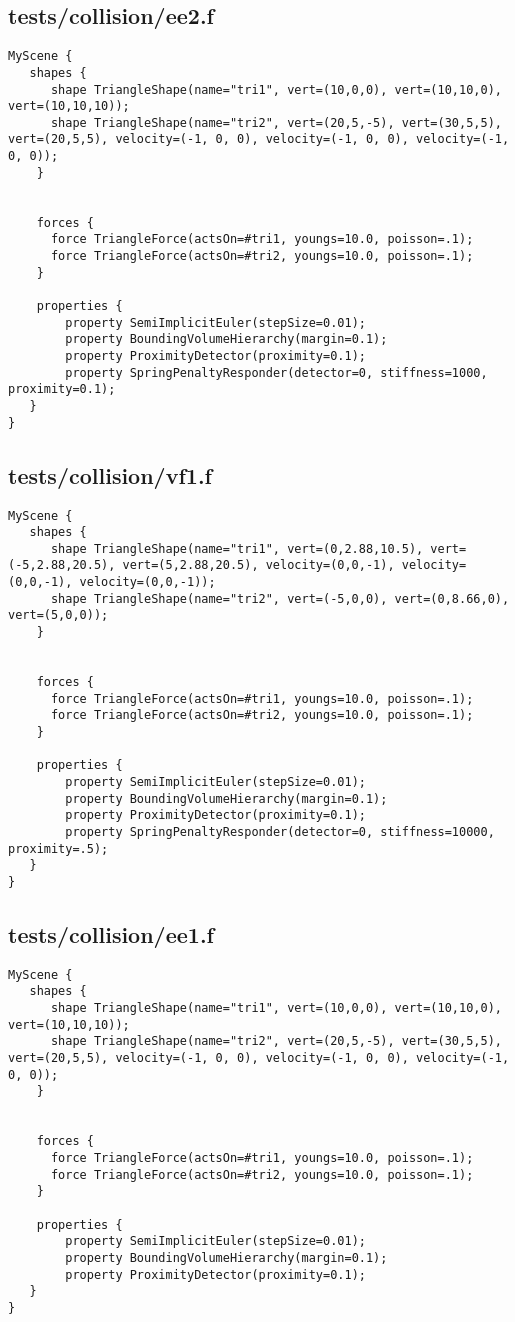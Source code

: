 \subsection*{tests/collision/ee2.f}
\begin{lstlisting}
MyScene {
   shapes {
      shape TriangleShape(name="tri1", vert=(10,0,0), vert=(10,10,0), vert=(10,10,10));
      shape TriangleShape(name="tri2", vert=(20,5,-5), vert=(30,5,5), vert=(20,5,5), velocity=(-1, 0, 0), velocity=(-1, 0, 0), velocity=(-1, 0, 0));
    }

    
    forces {
      force TriangleForce(actsOn=#tri1, youngs=10.0, poisson=.1);
      force TriangleForce(actsOn=#tri2, youngs=10.0, poisson=.1);
    }

    properties { 
        property SemiImplicitEuler(stepSize=0.01);
        property BoundingVolumeHierarchy(margin=0.1);
        property ProximityDetector(proximity=0.1);
        property SpringPenaltyResponder(detector=0, stiffness=1000, proximity=0.1);
   }
}
\end{lstlisting}

\subsection*{tests/collision/vf1.f}
\begin{lstlisting}
MyScene {
   shapes {
      shape TriangleShape(name="tri1", vert=(0,2.88,10.5), vert=(-5,2.88,20.5), vert=(5,2.88,20.5), velocity=(0,0,-1), velocity=(0,0,-1), velocity=(0,0,-1));
      shape TriangleShape(name="tri2", vert=(-5,0,0), vert=(0,8.66,0), vert=(5,0,0));
    }

    
    forces {
      force TriangleForce(actsOn=#tri1, youngs=10.0, poisson=.1);
      force TriangleForce(actsOn=#tri2, youngs=10.0, poisson=.1);
    }

    properties { 
        property SemiImplicitEuler(stepSize=0.01);
        property BoundingVolumeHierarchy(margin=0.1);
        property ProximityDetector(proximity=0.1);
        property SpringPenaltyResponder(detector=0, stiffness=10000, proximity=.5);
   }
}
\end{lstlisting}

\subsection*{tests/collision/ee1.f}
\begin{lstlisting}
MyScene {
   shapes {
      shape TriangleShape(name="tri1", vert=(10,0,0), vert=(10,10,0), vert=(10,10,10));
      shape TriangleShape(name="tri2", vert=(20,5,-5), vert=(30,5,5), vert=(20,5,5), velocity=(-1, 0, 0), velocity=(-1, 0, 0), velocity=(-1, 0, 0));
    }

    
    forces {
      force TriangleForce(actsOn=#tri1, youngs=10.0, poisson=.1);
      force TriangleForce(actsOn=#tri2, youngs=10.0, poisson=.1);
    }

    properties { 
        property SemiImplicitEuler(stepSize=0.01);
        property BoundingVolumeHierarchy(margin=0.1);
        property ProximityDetector(proximity=0.1);
   }
}
\end{lstlisting}


